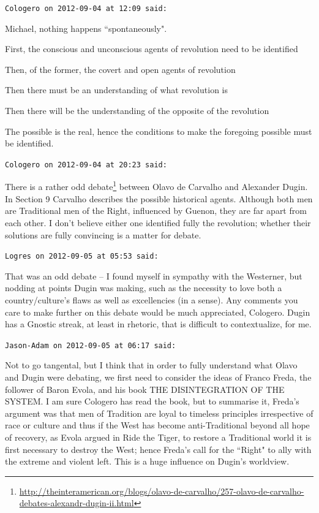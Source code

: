 \begin{footnotesize}
\begin{sffamily}
\texttt{Cologero on 2012-09-04 at 12:09 said: }

Michael, nothing happens ``spontaneously".

First, the conscious and unconscious agents of revolution need to be identified

Then, of the former, the covert and open agents of revolution

Then there must be an understanding of what revolution is

Then there will be the understanding of the opposite of the revolution

The possible is the real, hence the conditions to make the foregoing possible must be identified.


\hfill

\texttt{Cologero on 2012-09-04 at 20:23 said: }

There is a rather odd debate\footnote{\url{http://theinteramerican.org/blogs/olavo-de-carvalho/257-olavo-de-carvalho-debates-alexandr-dugin-ii.html}} between Olavo de Carvalho and Alexander Dugin. In Section 9 Carvalho describes the possible historical agents. Although both men are Traditional men of the Right, influenced by Guenon, they are far apart from each other. I don't believe either one identified fully the revolution; whether their solutions are fully convincing is a matter for debate.


\hfill

\texttt{Logres on 2012-09-05 at 05:53 said: }

That was an odd debate – I found myself in sympathy with the Westerner, but nodding at points Dugin was making, such as the necessity to love both a country/culture's flaws as well as excellencies (in a sense). Any comments you care to make further on this debate would be much appreciated, Cologero. Dugin has a Gnostic streak, at least in rhetoric, that is difficult to contextualize, for me.


\hfill

\texttt{Jason-Adam on 2012-09-05 at 06:17 said: }

Not to go tangental, but I think that in order to fully understand what Olavo and Dugin were debating, we first need to consider the ideas of Franco Freda, the follower of Baron Evola, and his book THE DISINTEGRATION OF THE SYSTEM. I am sure Cologero has read the book, but to summarise it, Freda's argument was that men of Tradition are loyal to timeless principles irrespective of race or culture and thus if the West has become anti-Traditional beyond all hope of recovery, as Evola argued in Ride the Tiger, to restore a Traditional world it is first necessary to destroy the West; hence Freda's call for the ``Right" to ally with the extreme and violent left. This is a huge influence on Dugin's worldview.



\end{sffamily}
\end{footnotesize}
